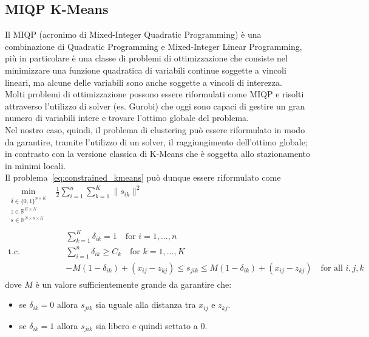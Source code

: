 \documentclass{article}
\begin{document}
    \subsection{MIQP K-Means}
    Il MIQP (acronimo di Mixed-Integer Quadratic Programming) è una combinazione di Quadratic Programming e Mixed-Integer Linear Programming, più in particolare è una classe di problemi di ottimizzazione che consiste nel minimizzare una funzione quadratica di variabili continue soggette a vincoli lineari, ma alcune delle variabili sono anche soggette a vincoli di interezza.\\
    Molti problemi di ottimizzazione possono essere riformulati come MIQP e risolti attraverso l'utilizzo di solver (es. Gurobi) che oggi sono capaci di gestire un gran numero di variabili intere e trovare l'ottimo globale del problema.\\
    Nel nostro caso, quindi, il problema di clustering può essere riformulato in modo da garantire, tramite l'utilizzo di un solver, il raggiungimento dell'ottimo globale; in contrasto con la versione classica di K-Means che è soggetta allo stazionamento in minimi locali.\\
    Il problema~\ref{eq:constrained_kmeans} può dunque essere riformulato come
    \begin{equation}
        \begin{aligned}
            \min_{\substack{
                \delta \in \{0, 1\}^{n \times K}\\
                z \in \mathbb{R}^{K \times N} \\
                s \in \mathbb{R}^{N \times n \times K}}} &
            \frac{1}{2} \sum_{i=1}^{n} \sum_{k=1}^{K} \|s_{ik}\|^2 \\
            \text{t.c.} \quad &
            \begin{aligned}
                & \sum_{k=1}^{K} \delta_{ik} = 1 \quad \text{for $i=1,\dots,n$} \\
                & \sum_{i=1}^{n} \delta_{ik} \geq C_k \quad \text{for $k=1,\dots,K$} \\
                & -M(1-\delta_{ik}) + (x_{ij}-z_{kj}) \leq s_{jik} \leq M(1-\delta_{ik}) + (x_{ij}-z_{kj}) \quad \text{for all $i, j, k$}
            \end{aligned}
        \end{aligned}
        \label{eq:MIQkmeans}
    \end{equation}
    dove $M$ è un valore sufficientemente grande da garantire che:
    \begin{itemize}
        \item se $\delta_{ik} = 0$ allora $s_{jik}$ sia uguale alla distanza tra $x_{ij}$ e $z_{kj}$.
        \item se $\delta_{ik} = 1$ allora $s_{jik}$ sia libero e quindi settato a 0.
    \end{itemize}
\end{document}

